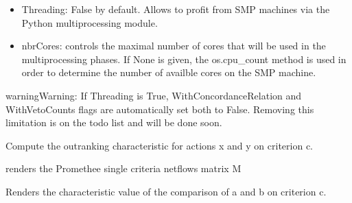 \documentclass[letterpaper,10pt,english]{sphinxmanual}
\begin{document}
\begin{fulllineitems}
\begin{description}
\begin{itemize}
\item {} 
Threading: False by default. Allows to profit from SMP machines via the Python multiprocessing module.

\item {} 
nbrCores: controls the maximal number of cores that will be used in the multiprocessing phases.
If None is given, the os.cpu\_count method is used in order to determine the number of availble cores on the SMP machine.

\end{itemize}

\end{description}

\begin{notice}{warning}{Warning:}
If Threading is True, WithConcordanceRelation and WithVetoCounts flags are automatically set both to False.
Removing this limitation is on the todo list and will be done soon.
\end{notice}

\begin{fulllineitems}
\label{techDoc:outrankingDigraphs.BipolarOutrankingDigraph.computeCriterionRelation}
Compute the outranking characteristic for actions x and y
on criterion c.

\end{fulllineitems}


\begin{fulllineitems}
\label{techDoc:outrankingDigraphs.BipolarOutrankingDigraph.computeSingleCriteriaNetflows}
renders the Promethee single criteria netflows matrix M

\end{fulllineitems}


\begin{fulllineitems}
\label{techDoc:outrankingDigraphs.BipolarOutrankingDigraph.criterionCharacteristicFunction}
Renders the characteristic value of the comparison of a and b on criterion c.


\end{fulllineitems}
\end{fulllineitems}
\end{document}
